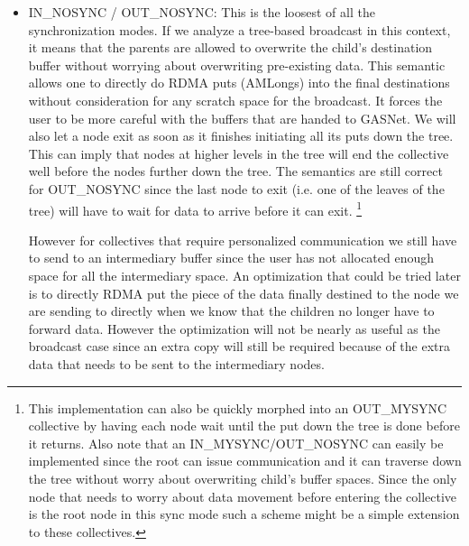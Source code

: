 \documentclass[times,10pt]{article}
\begin{document}
\begin{itemize}
\item IN\_NOSYNC / OUT\_NOSYNC: This is the loosest of all the synchronization modes. If we analyze a tree-based broadcast in this context, it means that the parents are allowed to overwrite the child's destination buffer without worrying about overwriting pre-existing data. This semantic allows one to directly do RDMA puts (AMLongs) into the final destinations without consideration for any scratch space for the broadcast. It forces the user to be more careful with the buffers that are handed to GASNet. We will also let a node exit as soon as it finishes initiating all its puts down the tree. This can imply that nodes at higher levels in the tree will end the collective well before the nodes further down the tree. The semantics are still correct for OUT\_NOSYNC since the last node to exit (i.e. one of the leaves of the tree) will have to wait for data to arrive before it can exit. \footnote{This implementation can also be quickly morphed into an OUT\_MYSYNC collective by having each node wait until the put down the tree is done before it returns. Also note that an IN\_MYSYNC/OUT\_NOSYNC can easily be implemented since the root can issue communication and it can traverse down the tree without worry about overwriting child's buffer spaces. Since the only node that needs to worry about data movement before entering the collective is the root node in this sync mode such a scheme might be a simple extension to these collectives.}

However for collectives that require personalized communication we still have to send to an intermediary buffer since the user has not allocated enough space for all the intermediary space. An optimization that could be tried later is to directly RDMA put the piece of the data finally destined to the node we are sending to directly when we know that the children no longer have to forward data. However the optimization will not be nearly as useful as the broadcast case since an extra copy will still be required because of the extra data that needs to be sent to the intermediary nodes. 


\end{itemize}
\end{document}
